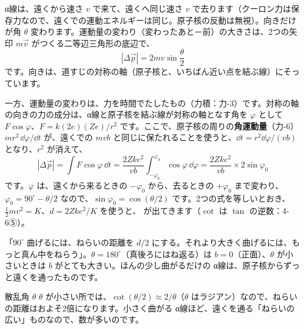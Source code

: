 α線は、遠くから速さ $v$ で来て、遠くへ同じ速さ $v$ で去ります（クーロン力は保存力なので、遠くでの運動エネルギーは同じ。原子核の反動は無視）。向きだけが角 $\theta$ 変わります。運動量の変わり（変わったあと－前）の大きさは、2つの矢印 $m\vec v$ がつくる二等辺三角形の底辺で、
\[ |\Delta\vec p|=2mv\sin\frac{\theta}{2} \]
です。向きは、道すじの対称の軸（原子核と、いちばん近い点を結ぶ線）にそっています。

一方、運動量の変わりは、力を時間でたしたもの（力積：力-3）です。対称の軸の向きの力の成分は、α線と原子核を結ぶ線が対称の軸となす角を $\varphi$ として $F\cos\varphi$、$F=k(2e)(Ze)/r^2$ です。ここで、原子核の周りの\textbf{角運動量}（力-6）$mr^2\,\dd\varphi/\dd t$ が、遠くでの $mvb$ と同じに保たれることを使うと、$\dd t=r^2\dd\varphi/(vb)$ となり、$r^2$ が消えて、
\[ |\Delta\vec p|=\int F\cos\varphi\,\dd t=\frac{2Zke^2}{vb}\int_{-\varphi_0}^{\varphi_0}\cos\varphi\,\dd\varphi=\frac{2Zke^2}{vb}\times2\sin\varphi_0 \]
です。$\varphi$ は、遠くから来るときの $-\varphi_0$ から、去るときの $+\varphi_0$ まで変わり、$\varphi_0=90^\circ-\theta/2$ なので、$\sin\varphi_0=\cos(\theta/2)$ です。2つの式を等しいとおき、$\tfrac12mv^2=K$、$d=2Zke^2/K$ を使うと、
\label{ph:原-1:cot}が出てきます（$\cot$ は $\tan$ の逆数：4-6⑤）。

\begin{phyomi}[$b=\dfrac{d}{2}\cot\dfrac{\theta}{2}$]
「$90^\circ$ 曲げるには、ねらいの距離を $d/2$ にする。それより大きく曲げるには、もっと真ん中をねらう」。$\theta=180^\circ$（真後ろにはね返る）は $b=0$（正面）、$\theta$ が小さいときは $b$ がとても大きい。ほんの少し曲がるだけの α線は、原子核からずっと遠くを通ったものです。
\end{phyomi}

\begin{phbaisuru}[半分]{散乱角 $\theta$}
$\theta$ が小さい所では、$\cot(\theta/2)\approx2/\theta$（$\theta$ はラジアン）なので、ねらいの距離はおよそ2倍になります。小さく曲がる α線ほど、遠くを通る「ねらいの広い」ものなので、数が多いのです。
\par\smallskip\noindent{}
\end{phbaisuru}

